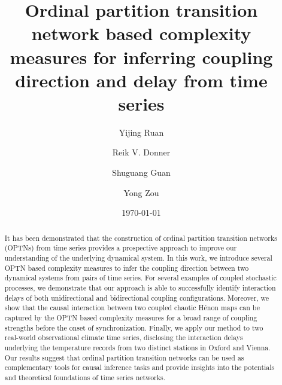 \documentclass[12pt,aip,cha,reprint,nofootinbib]{revtex4-1}
\begin{document}
\title{Ordinal partition transition network based complexity measures for inferring coupling direction and delay from time series}

\author{Yijing Ruan}

\author{Reik V. Donner}

\author{Shuguang Guan}

\author{Yong Zou}

\date{\today}

\begin{abstract}
It has been demonstrated that the construction of ordinal {\color{red}partition} transition networks (OPTNs) from time series provides a prospective approach to improve our understanding of the underlying dynamical system. In this work, we introduce several OPTN based complexity measures to infer the coupling direction between two dynamical systems from pairs of time series. For several examples of coupled stochastic processes, we demonstrate that our approach is able to successfully identify interaction delays of both unidirectional and bidirectional coupling configurations. Moreover, we show that the causal interaction between two coupled chaotic H\'enon maps can be captured by the OPTN based complexity measures for a broad range of coupling strengths before the onset of synchronization. Finally, we apply our method to two real-world observational climate time series, disclosing the interaction delays underlying the temperature records from two distinct stations in Oxford and Vienna. Our results suggest that ordinal {\color{red}partition} transition networks can be used as complementary tools for causal inference tasks and provide insights into the potentials and theoretical foundations of time series networks. 
\end{abstract}
\end{document}
